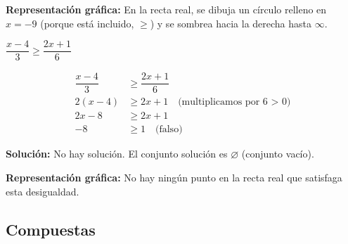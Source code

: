 \begin{exercise}
\begin{solucion}
\textbf{Representación gráfica:} En la recta real, se dibuja un círculo relleno en $x = -9$ (porque está incluido, $\ge$) y se sombrea hacia la derecha hasta $\infty$.
\end{solucion}

\problem $\dfrac{x - 4}{3} \ge \dfrac{2x + 1}{6}$

\begin{solucion}
\begin{align*}
\dfrac{x - 4}{3} &\ge \dfrac{2x + 1}{6} \\
2(x - 4) &\ge 2x + 1 \quad \text{(multiplicamos por 6 > 0)} \\
2x - 8 &\ge 2x + 1 \\
-8 &\ge 1 \quad \text{(falso)}
\end{align*}

\textbf{Solución:} No hay solución. El conjunto solución es $\varnothing$ (conjunto vacío).

\textbf{Representación gráfica:} No hay ningún punto en la recta real que satisfaga esta desigualdad.
\end{solucion}
\end{exercise}

\subsection*{Compuestas}

